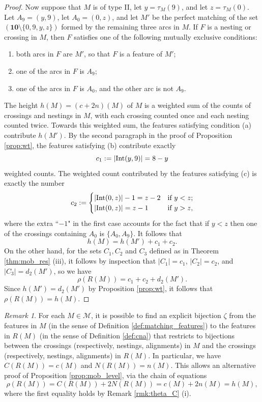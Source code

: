 \documentclass[11pt]{amsart}
\theoremstyle{plain}
\theoremstyle{definition}
\theoremstyle{remark}
\newtheorem{rmk}[theorem]{Remark}
\numberwithin{equation}{section}
\newcommand{\calm}{\mathcal{M}}
\newcommand{\ten}{\mathbf{10}}
\DeclareMathOperator{\interior}{\rm{Int}}
\newcommand{\abs}[1]{\lvert #1 \rvert}
\begin{document}
\begin{proof}
Now suppose that $M$ is of type II, let $y=\tau_M(9)$, and let $z=\tau_M(0)$.
Let $A_9=(y,9)$,
let $A_0=(0,z)$, and let $M'$ be the perfect matching of
the set $(\ten\setminus\{0,9,y,z\})$ formed by the remaining three arcs in $M$. 
If $F$ is a nesting or crossing in $M$, then $F$ satisfies one of
the following mutually exclusive conditions: 
\begin{enumerate}
  \item[(a)] both arcs in $F$ are $M'$, so that $F$ is a feature of $M'$;
  \item[(b)] one of the arcs in $F$ is $A_9$;
  \item[(c)] one of the arcs in $F$ is $A_0$, and the other arc is
    not $A_9$. 
\end{enumerate}
The height $h(M)=(c+2n)(M)$ of $M$ is a weighted sum of the counts of crossings and
nestings in $M$, with each crossing counted once and each nesting counted twice.
Towards this weighted sum, the features satisfying condition (a) contribute
$h(M')$. By the second paragraph in the proof of Proposition \ref{prop:wt}, the features satisfying (b)
contribute exactly 
\[
c_1:=\abs{\interior(y,9)}=8-y
\] weighted counts. The weighted
count contributed by the features satisfying (c) is exactly 
the number
\[
c_2 :=  
\begin{cases}
  \abs{\interior(0,z)}-1= z-2 & \text{if $y<z$};\\
  \abs{\interior(0,z)} = z-1 & \text{if $y>z$},
\end{cases}
\]
where the extra ``$-1$" in the first case accounts for the fact that if $y<z$
then one of the crossings containing $A_0$ is $\{A_0,A_9\}$. It follows that 
\[
h(M)=h(M')+c_1+c_2.
\]
On the other hand, for the sets $C_1, C_2$ and $C_3$ defined as in Theorem
\ref{thm:mob_res} (iii), it follows by inspection that
$\abs{C_1}=c_1$, $\abs{C_2}=c_2$, and $\abs{C_3}=d_2(M')$, so we have 
\[
\rho(R(M))= c_1+c_2+d_2(M').
\]
Since $h(M')=d_2(M')$ by Proposition \ref{prop:wt},  it follows that
$\rho(R(M))=h(M)$.
\end{proof}

\begin{rmk}
\label{rmk:features}
For each $M\in \calm$, it is possible to find an explicit bijection $\zeta$ from
the features in $M$ (in the sense of Definition \ref{def:matching_features}) to
the features in $R(M)$ (in the sense of Definition \ref{def:cna}) that restricts
to bijections between the crossings (respectively, nestings, alignments) in $M$
and the crossings (respectively, nestings, alignments) in $R(M)$. In particular,
we have $C(R(M))=c(M)$ and $N(R(M))=n(M)$. This allows an
alternative proof of Proposition \ref{prop:mob_level}, via the chain of
equations
\[
\rho(R(M))=C(R(M))+2N(R(M))=c(M)+2n(M)=h(M),
\]
where the first equality holds by Remark \ref{rmk:theta_C} (i).
\end{rmk}
\end{document}
